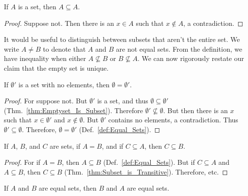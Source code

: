             \begin{theorem}
                \label{thm:Set_Is_Subset_Of_Self}%
                If $A$ is a set, then $A\subseteq{A}$.
            \end{theorem}
            \begin{proof}
                Suppose not. Then there is an $x\in{A}$
                such that $x\notin{A}$, a contradiction.
            \end{proof}
            It would be useful to distinguish between subsets that aren't the
            entire set.
            We write $A\ne{B}$ to denote that $A$ and $B$ are not equal sets.
            From the definition, we have inequality when either
            $A\nsubseteq{B}$ or $B\nsubseteq{A}$. We can now rigorously restate
            our claim that the empty set is unique.
            \begin{theorem}
                If $\emptyset'$ is a set with no elements,
                then $\emptyset=\emptyset'$.
            \end{theorem}
            \begin{proof}
                For suppose not. But $\emptyset'$ is a set, and thus
                $\emptyset\subseteq\emptyset'$
                (Thm.~\ref{thm:Emptyset_Is_Subset}). Therefore
                $\emptyset'\nsubseteq\emptyset$. But then there is an $x$ such
                that $x\in\emptyset'$ and $x\notin\emptyset$. But $\emptyset'$
                contains no elements, a contradiction. Thus
                $\emptyset'\subseteq\emptyset$. Therefore,
                $\emptyset=\emptyset'$ (Def.~\ref{def:Equal_Sets}).
            \end{proof}
            \begin{theorem}
                \label{thm:Subsets_of_Equal_Sets}%
                If $A$, $B$, and $C$ are sets, if $A=B$, and if
                $C\subseteq{A}$, then $C\subseteq{B}$.
            \end{theorem}
            \begin{proof}
                For if $A=B$, then $A\subseteq{B}$ (Def.~\ref{def:Equal_Sets}).
                But if $C\subseteq{A}$ and $A\subseteq{B}$, then $C\subseteq{B}$
                (Thm.~\ref{thm:Subset_is_Transitive}). Therefore, etc.
            \end{proof}
            \begin{theorem}
                \label{thm:Equality_Symmetric}%
                If $A$ and $B$ are equal sets, then $B$ and
                $A$ are equal sets.
            \end{theorem}
